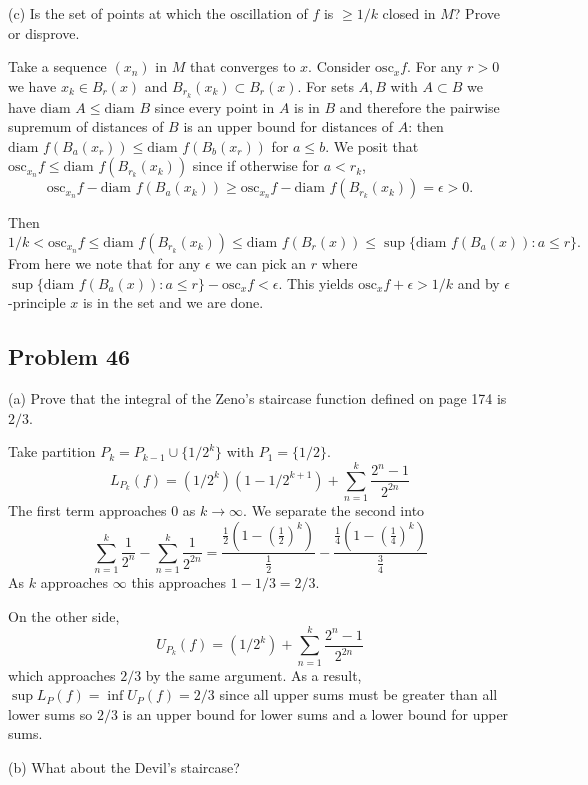 \documentclass{amsart}
\begin{document}
(c) Is the set of points at which the oscillation of $f$ is $\geq 1/k$ closed in $M$? Prove or
disprove.

\medskip \noindent Take a sequence $(x_n)$ in $M$ that converges to $x$. Consider $\text{osc}_xf$.
For any $r>0$ we have $x_k\in B_r(x)$ and $B_{r_k}(x_k)\subset B_r(x)$. For sets $A, B$ with $A\subset B$
we have $\text{diam } A\leq \text{diam } B$ since every point in $A$ is in $B$ and therefore the pairwise
supremum of distances of $B$ is an upper bound for distances of $A$: then $\text{diam }f(B_a(x_r))\leq\text{diam }f(B_b(x_r))$
for $a\leq b$. We posit that $\text{osc}_{x_n}f\leq\text{diam }f(B_{r_k}(x_k))$ since if otherwise 
for $a<r_k$, \[\text{osc}_{x_n}f-\text{diam }f(B_a(x_k))\geq \text{osc}_{x_n}f-\text{diam }f(B_{r_k}(x_k))=\epsilon>0.\]

\medskip \noindent Then \[1/k<\text{osc}_{x_n}f\leq\text{diam }f(B_{r_k}(x_k))\leq \text{diam }f(B_r(x))\leq\sup\{\text{diam }f(B_a(x)):a\leq r\}.\]
From here we note that for any $\epsilon$ we can pick an $r$ where $\sup\{\text{diam }f(B_a(x)):a\leq r\}-\text{osc}_xf<\epsilon$.
This yields $\text{osc}_xf+\epsilon>1/k$ and by $\epsilon$-principle $x$ is in the set and we are done.

\newpage

\subsection*{Problem 46} 

(a) Prove that the integral of the Zeno's staircase function defined on
page 174 is $2/3$. 

\medskip \noindent Take partition $P_k = P_{k-1} \cup \{1/2^k\}$ with $P_1 = \{1/2\}$. 
\[L_{P_k}(f)=(1/2^k)(1-1/2^{k+1})+\sum_{n=1}^k\frac{2^n-1}{2^{2n}}\]
The first term approaches $0$ as $k\rightarrow \infty$. We separate the second into 
\[\sum_{n=1}^k\frac{1}{2^n}-\sum_{n=1}^k\frac{1}{2^{2n}}=\frac{\frac{1}{2}(1-(\frac{1}{2})^k)}{\frac{1}{2}}-\frac{\frac{1}{4}(1-(\frac{1}{4})^k)}{\frac{3}{4}}\]
As $k$ approaches $\infty$ this approaches $1-1/3=2/3$.

On the other side, \[U_{P_k}(f)=(1/2^k)+\sum_{n=1}^k\frac{2^n-1}{2^{2n}}\] which approaches $2/3$ by the same argument.
As a result, $\sup L_P(f)=\inf U_P(f) = 2/3$ since all upper sums must be greater than all lower sums so $2/3$ is
an upper bound for lower sums and a lower bound for upper sums.

\bigskip

(b) What about the Devil's staircase?
\end{document}
